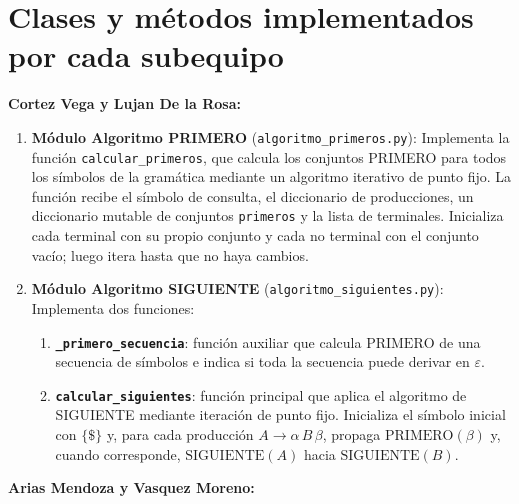 \section{Clases y métodos implementados por cada subequipo}

\textbf{Cortez Vega y Lujan De la Rosa:}

\begin{enumerate}
  \item \textbf{Módulo Algoritmo PRIMERO} (\texttt{algoritmo\_primeros.py}): Implementa la
    función \texttt{calcular\_primeros}, que calcula los conjuntos PRIMERO para todos los
    símbolos de la gramática mediante un algoritmo iterativo de punto fijo. La función recibe
    el símbolo de consulta, el diccionario de producciones, un diccionario mutable de conjuntos
    \texttt{primeros} y la lista de terminales. Inicializa cada terminal con su propio conjunto
    y cada no terminal con el conjunto vacío; luego itera hasta que no haya cambios.

  \item \textbf{Módulo Algoritmo SIGUIENTE} (\texttt{algoritmo\_siguientes.py}): Implementa
    dos funciones:
    \begin{enumerate}[label=\alph*.]
      \item \textbf{\texttt{\_primero\_secuencia}}: función auxiliar que calcula
        $\text{PRIMERO}$ de una secuencia de símbolos e indica si toda la secuencia puede
        derivar en $\varepsilon$.
      \item \textbf{\texttt{calcular\_siguientes}}: función principal que aplica el algoritmo
        de SIGUIENTE mediante iteración de punto fijo. Inicializa el símbolo inicial con
        $\{\$\}$ y, para cada producción $A \to \alpha\, B\, \beta$, propaga
        $\text{PRIMERO}(\beta)$ y, cuando corresponde, $\text{SIGUIENTE}(A)$ hacia
        $\text{SIGUIENTE}(B)$.
    \end{enumerate}
\end{enumerate}

\vspace{0.8cm}

\textbf{Arias Mendoza y Vasquez Moreno:}

